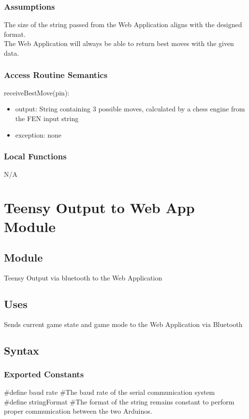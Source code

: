 \documentclass[12pt, titlepage]{article}
\begin{document}
        \subsubsection{Assumptions}
        The size of the string passed from the Web Application aligns with the designed format. \\
        The Web Application will always be able to return best moves with the given data. 
    
        \subsubsection{Access Routine Semantics}
            \noindent receiveBestMove(pin):
            \begin{itemize}
                \item output: String containing 3 possible moves, calculated by a chess engine from the FEN input string
                \item exception: none
            \end{itemize}
    
        \subsubsection{Local Functions}
        N/A
    

\newpage

\section{Teensy Output to Web App Module} \label{TeensyToWaTx}
    \subsection{Module}
    Teensy Output via bluetooth to the Web Application

    \subsection{Uses}
    Sends current game state and game mode to the Web Application via Bluetooth

    \subsection{Syntax}
    \subsubsection{Exported Constants}
    \#define baud rate \#The baud rate of the serial communication system\\
    \#define stringFormat \#The format of the string remains constant to perform proper 
    communication between the two Arduinos.
    
\end{document}
